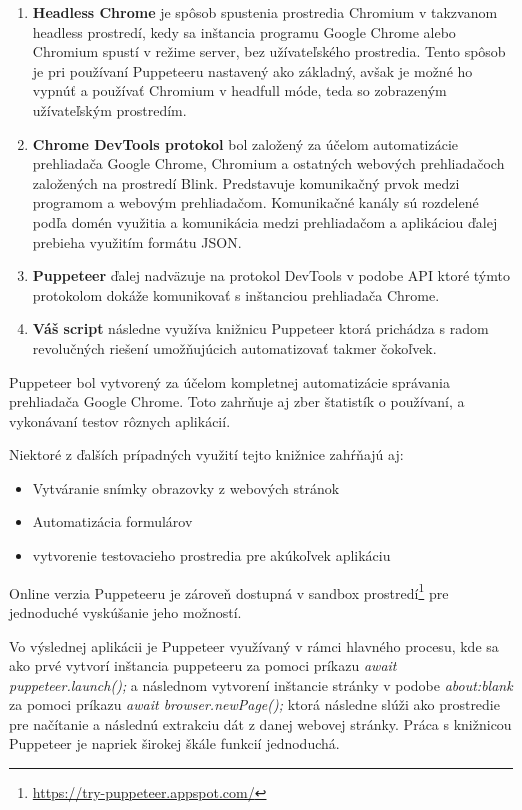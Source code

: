 \begin{enumerate}
  \item \textbf{Headless Chrome} je spôsob spustenia prostredia Chromium v takzvanom headless prostredí, kedy sa inštancia programu Google Chrome alebo Chromium spustí v režime server, bez užívateľského prostredia. Tento spôsob je pri používaní Puppeteeru nastavený ako základný, avšak je možné ho vypnúť a používať Chromium v headfull móde, teda so zobrazeným užívateľským prostredím.\cite{chromium}
  \item \textbf{Chrome DevTools protokol} bol založený za účelom automatizácie prehliadača Google Chrome, Chromium a ostatných webových prehliadačoch založených na prostredí Blink. Predstavuje komunikačný prvok medzi programom a webovým prehliadačom. Komunikačné kanály sú rozdelené podľa domén využitia a komunikácia medzi prehliadačom a aplikáciou ďalej prebieha využitím formátu JSON.\cite{devtools}
  \item \textbf{Puppeteer} ďalej nadväzuje na protokol DevTools v podobe API ktoré týmto protokolom dokáže komunikovať s inštanciou prehliadača Chrome. 
  \item \textbf{Váš script} následne využíva knižnicu Puppeteer ktorá prichádza s radom revolučných riešení umožňujúcich automatizovať takmer čokoľvek.
\end{enumerate}

\newpage

Puppeteer bol vytvorený za účelom kompletnej automatizácie správania prehliadača Google Chrome. Toto zahrňuje aj zber štatistík o používaní, a vykonávaní testov rôznych aplikácií.

Niektoré z ďalších prípadných využití tejto knižnice zahŕňajú aj:\cite{puppeteer}
\begin{itemize}
    \item {Vytváranie snímky obrazovky z webových stránok}
    \item {Automatizácia formulárov}
    \item {vytvorenie testovacieho prostredia pre akúkoľvek aplikáciu}
\end{itemize}

\bigskip

Online verzia Puppeteeru je zároveň dostupná v sandbox prostredí\footnote{\url{https://try-puppeteer.appspot.com/}} pre jednoduché vyskúšanie jeho možností.

\bigskip

Vo výslednej aplikácii je Puppeteer využívaný v rámci hlavného procesu, kde sa ako prvé vytvorí inštancia puppeteeru za pomoci príkazu \textit{await puppeteer.launch();} a následnom vytvorení inštancie stránky v podobe \textit{about:blank} za pomoci príkazu \textit{await browser.newPage();} ktorá následne slúži ako prostredie pre načítanie a následnú extrakciu dát z danej webovej stránky. Práca s knižnicou Puppeteer je napriek širokej škále funkcií jednoduchá.

